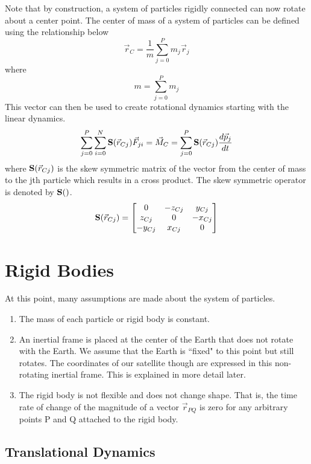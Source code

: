 \documentclass{article}
\begin{document}
Note that by construction, a system of particles rigidly connected can
now rotate about a center point. The center of mass of a system of
particles can be defined using the relationship below
\begin{equation}
\vec{r}_C = \frac{1}{m}\sum\limits_{j=0}^P m_j\vec{r}_{j}
\end{equation}
where
\begin{equation}
m = \sum\limits_{j=0}^P m_j
\end{equation}
This vector can then be used to create rotational dynamics starting
with the linear dynamics.
\begin{equation}
\sum\limits_{j=0}^P \sum\limits_{i=0}^N {\bf S}(\vec{r}_{Cj}) \vec{F}_{ji}  = \vec{M}_C = \sum\limits_{j=0}^P {\bf
  S}(\vec{r}_{Cj}) \frac{d\vec{p}_j}{dt}
\end{equation}
where ${\bf S}(\vec{r}_{Cj})$ is the skew symmetric matrix of the
vector from the center of mass to the jth particle which results in a
cross product. The skew symmetric operator is denoted by ${\bf
  S}()$. 
\begin{equation}
{\bf S}(\vec{r}_{Cj}) = \begin{bmatrix} 0 & -z_{Cj} & y_{Cj} \\ z_{Cj} & 0 &
  -x_{Cj} \\ -y_{Cj} & x_{Cj} & 0 \end{bmatrix}
\end{equation}
\section{Rigid Bodies}
At this point, many assumptions are made about the
system of particles.
\begin{enumerate}
\item The mass of each particle or rigid body is constant.
\item An inertial frame is placed at the center of the Earth that does
  not rotate with the Earth. We assume that the Earth is ``fixed" to
  this point but still rotates. The coordinates of our satellite
  though are expressed in this non-rotating inertial frame. This is
  explained in more detail later.
\item The rigid body is not flexible and does not change shape. That
  is, the time rate of change of the magnitude of a vector
  $\vec{r}_{PQ}$ is zero for any arbitrary points P and Q attached to
  the rigid body.
\end{enumerate}

\subsection{Translational Dynamics}
\end{document}
